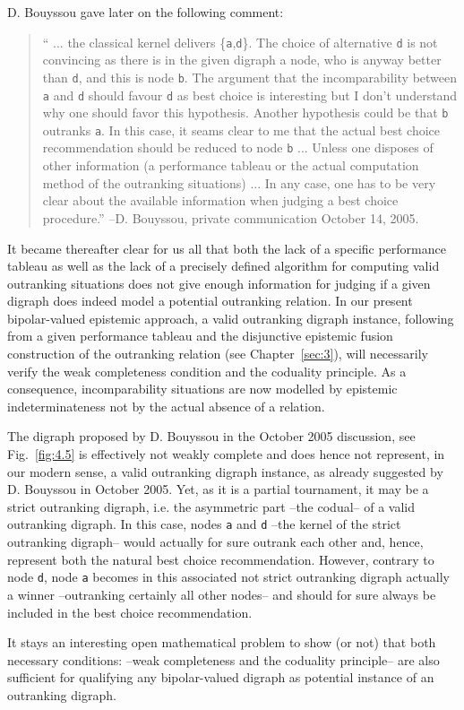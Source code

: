 \noindent D. Bouyssou gave later on the following comment:
\begin{quotation}
`` ... the classical kernel delivers \{\texttt{a},\texttt{d}\}. The choice of alternative \texttt{d} is not convincing as there is in the given digraph a node, who is anyway better than \texttt{d}, and this is node \texttt{b}. The argument that the incomparability between \texttt{a} and \texttt{d} should favour \texttt{d} as best choice is interesting but I don't understand why one should favor this hypothesis. Another hypothesis could be that \texttt{b} outranks \texttt{a}. In this case, it seams clear to me that the actual best choice recommendation should be reduced to node \texttt{b} ... Unless one disposes of other information (a performance tableau or the actual computation method of the outranking situations) ... In any case, one has to be very clear about the available information when judging a best choice procedure.'' --D. Bouyssou, private communication October 14, 2005.
\end{quotation}
It became thereafter clear for us all that both the lack of a specific performance tableau as well as the lack of a precisely defined algorithm for computing valid outranking situations does not give enough information for judging if a given digraph does indeed model a potential outranking relation. In our present bipolar-valued epistemic approach, a valid outranking digraph instance, following from a given performance tableau and the disjunctive epistemic fusion construction of the outranking relation (see Chapter~\vref{sec:3}), will necessarily verify the weak completeness condition and the coduality principle. As a consequence, incomparability situations are now modelled by epistemic indeterminateness not by the actual absence of a relation.

The digraph proposed by D. Bouyssou in the October 2005 discussion, see Fig.~\vref{fig:4.5} is effectively not weakly complete and does hence not represent, in our modern sense, a valid outranking digraph instance, as already suggested by D. Bouyssou in October 2005. Yet, as it is a partial tournament, it may be a strict outranking digraph, i.e. the asymmetric part --the codual-- of a valid outranking digraph. In this case, nodes \texttt{a} and \texttt{d} --the kernel of the strict outranking digraph-- would actually for sure outrank each other and, hence, represent both the natural best choice recommendation. However, contrary to node \texttt{d}, node \texttt{a} becomes in this associated not strict outranking digraph actually a \Condorcet winner --outranking certainly all other nodes-- and should for sure always be included in the best choice recommendation.

It stays an interesting open mathematical problem to show (or not) that both necessary conditions: --weak completeness and the coduality principle-- are also sufficient for qualifying any bipolar-valued digraph as potential instance of an outranking digraph.


\clearpage


%
